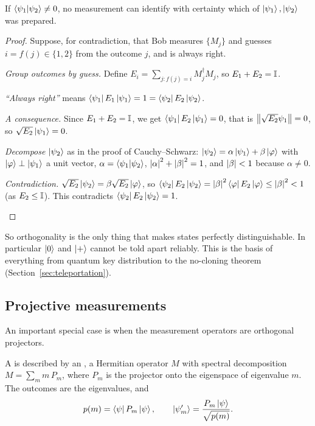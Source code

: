 \begin{theorem}\label{thm:no-distinguish}
  If $\left\langle\psi_1\middle|\psi_2\right\rangle\neq0$, no measurement can identify with certainty which of $\left|\psi_1\right\rangle,\left|\psi_2\right\rangle$ was prepared.
\end{theorem}
\begin{proof}
  Suppose, for contradiction, that Bob measures $\{M_j\}$ and guesses $i=f(j)\in\{1,2\}$ from the outcome $j$, and is always right.
  \begin{steps}
    \item \emph{Group outcomes by guess.} Define $E_i=\sum_{j:f(j)=i}M_j^\dagger M_j$, so $E_1+E_2=\mathbb{I}$.
    \item \emph{``Always right''} means $\left\langle\psi_1\right|E_1\left|\psi_1\right\rangle=1=\left\langle\psi_2\right|E_2\left|\psi_2\right\rangle$.
    \item \emph{A consequence.} Since $E_1+E_2=\mathbb{I}$, we get $\left\langle\psi_1\right|E_2\left|\psi_1\right\rangle=0$, that is $\left\|\sqrt{E_2}\psi_1\right\|=0$, so $\sqrt{E_2}\left|\psi_1\right\rangle=0$.
    \item \emph{Decompose $\left|\psi_2\right\rangle$} as in the proof of Cauchy--Schwarz: $\left|\psi_2\right\rangle=\alpha\left|\psi_1\right\rangle+\beta\left|\varphi\right\rangle$ with $\left|\varphi\right\rangle\perp\left|\psi_1\right\rangle$ a unit vector, $\alpha=\left\langle\psi_1\middle|\psi_2\right\rangle$, $\left|\alpha\right|^2+\left|\beta\right|^2=1$, and $\left|\beta\right|<1$ because $\alpha\neq0$.
    \item \emph{Contradiction.} $\sqrt{E_2}\left|\psi_2\right\rangle=\beta\sqrt{E_2}\left|\varphi\right\rangle$, so $\left\langle\psi_2\right|E_2\left|\psi_2\right\rangle=\left|\beta\right|^2\left\langle\varphi\right| E_2\left|\varphi\right\rangle\le\left|\beta\right|^2<1$ (as $E_2\le\mathbb{I}$). This contradicts $\left\langle\psi_2\right|E_2\left|\psi_2\right\rangle=1$. \qedhere
  \end{steps}
\end{proof}

So orthogonality is the only thing that makes states perfectly distinguishable. In particular $\left|0\right\rangle$ and $\left|+\right\rangle$ cannot be told apart reliably. This is the basis of everything from quantum key distribution to the no-cloning theorem (Section~\ref{sec:teleportation}).

\subsection{Projective measurements}

An important special case is when the measurement operators are orthogonal projectors.

\begin{definition}\label{def:projective}
  A  is described by an , a Hermitian operator $M$ with spectral decomposition $M=\sum_mm\,P_m$, where $P_m$ is the projector onto the eigenspace of eigenvalue $m$. The outcomes are the eigenvalues, and
  \[
    p(m)=\left\langle\psi\right| P_m\left|\psi\right\rangle,\qquad \left|\psi'_m\right\rangle=\frac{P_m\left|\psi\right\rangle}{\sqrt{p(m)}} .
  \]
\end{definition}

